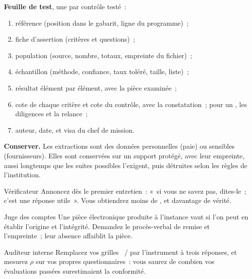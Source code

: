 \begin{boxprocedure}
\textbf{Feuille de test}, une par contrôle testé~:
\begin{enumerate}
    \item référence (position dans le gabarit, ligne du programme)~;
    \item fiche d'assertion (critères et questions)~;
    \item population (source, nombre, totaux, empreinte du fichier)~;
    \item échantillon (méthode, confiance, taux toléré, taille, liste)~;
    \item résultat élément par élément, avec la pièce examinée~;
    \item cote de chaque critère et cote du contrôle, avec la
          constatation~; pour un \NEK{}, les diligences et la relance~;
    \item auteur, date, et visa du chef de mission.
\end{enumerate}
\end{boxprocedure}

\begin{boxinfo}
\textbf{Conserver.} Les extractions sont des données personnelles (paie) ou
sensibles (fournisseurs). Elles sont conservées sur un support protégé, avec
leur empreinte, aussi longtemps que les suites possibles l'exigent, puis
détruites selon les règles de l'institution.
\end{boxinfo}

\begin{boxmetier}{Vérificateur}
Annoncez \NEK{} dès le premier entretien~: «~si vous ne savez pas,
dites-le~; c'est une réponse utile~». Vous obtiendrez moins de \OUI{}, et
davantage de vérité.
\end{boxmetier}

\begin{boxmetier}{Juge des comptes}
Une pièce électronique produite à l'instance vaut si l'on peut en établir
l'origine et l'intégrité. Demandez le procès-verbal de remise et
l'empreinte~; leur absence affaiblit la pièce.
\end{boxmetier}

\begin{boxmetier}{Auditeur interne}
Remplacez vos grilles \OUI{}~/ \NON{} par l'instrument à trois réponses, et
mesurez $\rho$ sur vos propres questionnaires~: vous saurez de combien vos
évaluations passées surestimaient la conformité.
\end{boxmetier}

